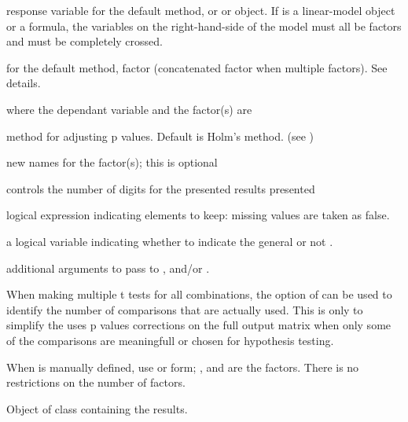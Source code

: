 \documentclass[a4paper]{book}
\begin{document}
\begin{Arguments}
\begin{ldescription}
\item[\code{y}] response variable for the default method, or  or
 object. If  is a linear-model object or a formula,
the variables on the right-hand-side of the model must all be factors and
must be completely crossed.
\item[\code{group}] for the default method, factor (concatenated factor when multiple factors). See details.
\item[\code{data}]  where the dependant variable and the factor(s) are
\item[\code{p.adjust.method}] method for adjusting p values. Default is Holm's method. (see ) 
\item[\code{column}] new names for the factor(s); this is optional 
\item[\code{digits}] controls the number of digits for the presented results presented
\item[\code{subset}] logical expression indicating elements to keep: missing values are taken as false.
\item[\code{silent}] a logical variable indicating whether to indicate the general   or not .
\item[\code{...}] additional arguments to pass to ,  and/or . 
\end{ldescription}
\end{Arguments}
%
\begin{Details}\relax
When making multiple t tests for all combinations, the  option of
 can be used to identify the number of comparisons that are actually used.
This is only to simplify the uses p values corrections on the full output
matrix when only some of the comparisons are meaningfull or chosen for hypothesis testing.


When  is manually defined, use  or
form; ,  and  are the factors. There is no restrictions on the number of factors.


\end{Details}
%
\begin{Value}
Object of class  containing the results.

\end{Value}
\end{document}
